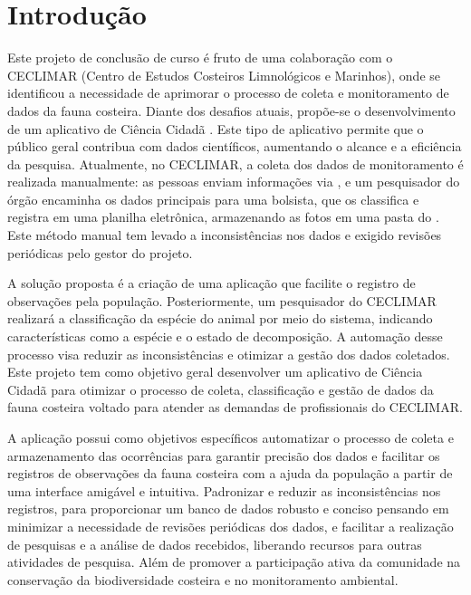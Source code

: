 
\chapter{Introdução} \label{chapter:intro}

Este projeto de conclusão de curso é fruto de uma colaboração com o CECLIMAR (Centro de Estudos Costeiros Limnológicos e Marinhos), onde se identificou a necessidade de aprimorar o processo de coleta e monitoramento de dados da fauna costeira. Diante dos desafios atuais, propõe-se o desenvolvimento de um aplicativo de Ciência Cidadã \cite{Martins_Cabral_2021}. Este tipo de aplicativo permite que o público geral contribua com dados científicos, aumentando o alcance e a eficiência da pesquisa.
Atualmente, no CECLIMAR, a coleta dos dados de monitoramento é realizada manualmente: as pessoas enviam informações via , e um pesquisador do órgão encaminha os dados principais para uma bolsista, que os classifica e registra em uma planilha eletrônica, armazenando as fotos em uma pasta do . Este método manual tem levado a inconsistências nos dados e exigido revisões periódicas pelo gestor do projeto.

A solução proposta é a criação de uma aplicação que facilite o registro de observações pela população. Posteriormente, um pesquisador do CECLIMAR realizará a classificação da espécie do animal por meio do sistema, indicando características como a espécie e o estado de decomposição. A automação desse processo visa reduzir as inconsistências e otimizar a gestão dos dados coletados.
Este projeto tem como objetivo geral desenvolver um aplicativo de Ciência Cidadã para otimizar o processo de coleta, classificação e gestão de dados da fauna costeira voltado para atender as demandas de profissionais do CECLIMAR.

A aplicação possui como objetivos específicos automatizar o processo de coleta e armazenamento das ocorrências para garantir precisão dos dados e facilitar os registros de observações da fauna costeira com a ajuda da população a partir de uma interface amigável e intuitiva. Padronizar e reduzir as inconsistências nos registros, para proporcionar um banco de dados robusto e conciso pensando em minimizar a necessidade de revisões periódicas dos dados, e facilitar a realização de pesquisas e a análise de dados recebidos, liberando recursos para outras atividades de pesquisa. Além de promover a participação ativa da comunidade na conservação da biodiversidade costeira e no monitoramento ambiental.

